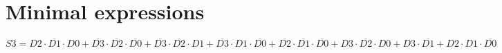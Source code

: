 \documentclass [15pt,a4paper,twoside]{article}
\begin{document}
\section{Minimal expressions}
$S3 = D2 \cdot  \overline{D1}  \cdot D0+ \overline{D3}  \cdot  \overline{D2}  \cdot  \overline{D0} + \overline{D3}  \cdot  \overline{D2}  \cdot D1+ \overline{D3}  \cdot D1 \cdot  \overline{D0} + \overline{D2}  \cdot  \overline{D1}  \cdot  \overline{D0} +D3 \cdot  \overline{D2}  \cdot D0+D3 \cdot  \overline{D1} +D2 \cdot D1 \cdot  \overline{D0} $~\\
\end{document}
